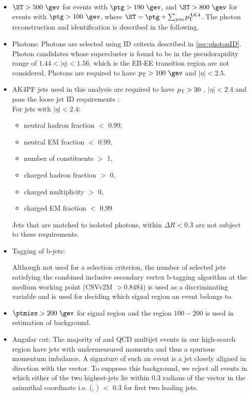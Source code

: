 \begin{itemize}
\item  $\ST>500\ \gev$ for events with $\ptg>190~\gev$,
 and $\ST>800~\gev$ for events with $\ptg>100~\gev$, where $\ST = \ptg+\sum_{\mathrm{jets}} \pt^{AK4}$.
The photon reconstruction and identification is described in the following.

\item Photons: 
Photons are selected using ID criteria described in \ref{sec:photonID}.
Photon candidates whose supercluster
is found to be in the pseudorapidity range of $1.44 < |\eta| < 1.56$, which is the EB-EE 
transition region are not considered.
Photons are required to have $\pt>100~\gev$
and $|\eta|<2.5$.

\item AK4PF jets used in this analysis are required to have $p_{\mathrm{T}}>30$ \gev, $|\eta|<2.4$ and pass the loose jet ID requirements \cite{CMS-PAS-JME-16-003}: \\
  For jets with $|\eta|<2.4$:
  \begin{itemize}
  \item neutral hadron fraction $<$ 0.99,
  \item neutral EM fraction $<$ 0.99,
  \item number of constituents $>$ 1,
  \item charged hadron fraction $>$ 0,
  \item charged multiplicity $>$ 0,
  \item charged EM fraction $<$ 0.99
  \end{itemize}
  Jets that are matched to isolated photons, within $\Delta R<0.3$ are not subject to these requirements.   

\item Tagging of b-jets:

  Although not used for a selection criterion, the number of selected
  jets satisfying the combined inclusive secondary vertex b-tagging algorithm at the medium working
  point (CSVv2M $>0.8484$) is used as a discriminating variable \cite{BTV-16-002} and is used for deciding which signal region an event 
  belongs to.

\item $\ptmiss>200\ \gev$ for signal region and the region $100-200$ \gev \ptmiss is used in estimation of \gjets background.
\item Angular cut:
  The majority of \gjets and QCD multijet events in our high-\ptmiss search region
  have jets with undermeasured momenta and thus a spurious
  momentum imbalance.  A signature of such an event is a jet closely
  aligned in direction with the \ptmiss vector.  To suppress this background, we reject
  all events in which either of the two highest-\pt jets lie within 0.3 radians
  of the \ptmiss vector in the azimuthal coordinate i.e. \dphi(\ptvecmiss, \ptvecjet) $<$ 0.3 for first two leading jets.


\end{itemize}
